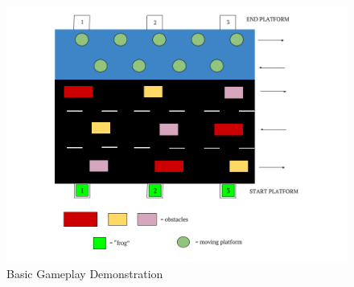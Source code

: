 \documentclass[journal, twocolumn, final,11pt,letterpaper]{IEEEtran}
\begin{document}
\begin{figure} [H]
	\centering
	\includegraphics[scale=.5]{Frogger.png}
	\caption{Basic Gameplay Demonstration\label{fig:frogger}}
\end{figure}            

     
\end{document}
